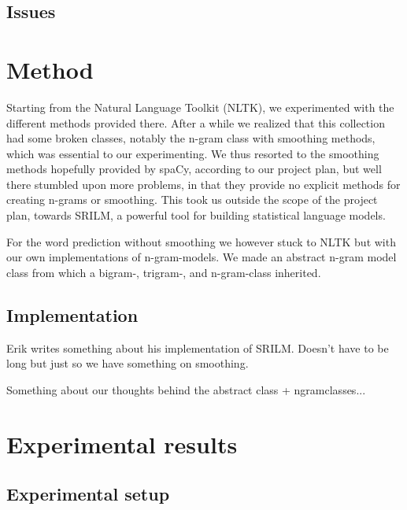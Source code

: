 \documentclass[a4paper,12pt]{article}
\begin{document}
\subsection{Issues}


\section{Method}
\label{sec:method}

Starting from the Natural Language Toolkit (NLTK), we experimented with the different methods provided there. After a while we realized that this collection had some broken classes, notably the n-gram class with smoothing methods, which was essential to our experimenting. We thus resorted to the smoothing methods hopefully provided by spaCy, according to our project plan, but well there stumbled upon more problems, in that they provide no explicit methods for creating n-grams or smoothing. This took us outside the scope of the project plan, towards SRILM, a powerful tool for building statistical language models.

For the word prediction without smoothing we however stuck to NLTK but with our own implementations of n-gram-models. We made an abstract n-gram model class from which a bigram-, trigram-, and n-gram-class inherited.

\subsection{Implementation}
\label{sec:impl}

Erik writes something about his implementation of SRILM. Doesn't have to be long but just so we have something on smoothing.

Something about our thoughts behind the abstract class + ngramclasses...

\section{Experimental results}
\label{sec:exps}

\subsection{Experimental setup}
\end{document}
